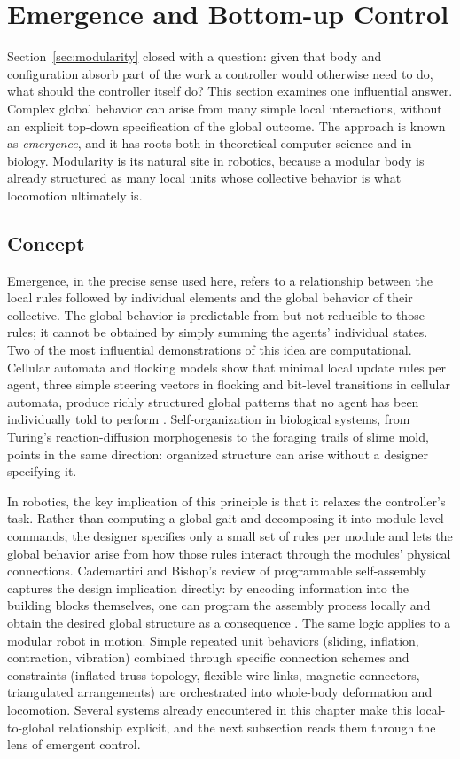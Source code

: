 \section{Emergence and Bottom-up Control}
\label{sec:emergence}

Section~\ref{sec:modularity} closed with a question: given that body and configuration absorb part of the work a controller would otherwise need to do, what should the controller itself do? This section examines one influential answer. Complex global behavior can arise from many simple local interactions, without an explicit top-down specification of the global outcome. The approach is known as \textit{emergence}, and it has roots both in theoretical computer science and in biology. Modularity is its natural site in robotics, because a modular body is already structured as many local units whose collective behavior is what locomotion ultimately is.

\subsection{Concept}
\label{subsec:mrr-Concept}
 
Emergence, in the precise sense used here, refers to a relationship between the local rules followed by individual elements and the global behavior of their collective. The global behavior is predictable from but not reducible to those rules; it cannot be obtained by simply summing the agents' individual states. Two of the most influential demonstrations of this idea are computational. Cellular automata and flocking models show that minimal local update rules per agent, three simple steering vectors in flocking and bit-level transitions in cellular automata, produce richly structured global patterns that no agent has been individually told to perform \cite{StephenWolframNew}. Self-organization in biological systems, from Turing's reaction-diffusion morphogenesis to the foraging trails of slime mold, points in the same direction: organized structure can arise without a designer specifying it.

In robotics, the key implication of this principle is that it relaxes the controller's task. Rather than computing a global gait and decomposing it into module-level commands, the designer specifies only a small set of rules per module and lets the global behavior arise from how those rules interact through the modules' physical connections. Cademartiri and Bishop's review of programmable self-assembly captures the design implication directly: by encoding information into the building blocks themselves, one can program the assembly process locally and obtain the desired global structure as a consequence \cite{cademartiriProgrammableSelfassembly2015}. The same logic applies to a modular robot in motion. Simple repeated unit behaviors (sliding, inflation, contraction, vibration) combined through specific connection schemes and constraints (inflated-truss topology, flexible wire links, magnetic connectors, triangulated arrangements) are orchestrated into whole-body deformation and locomotion. Several systems already encountered in this chapter make this local-to-global relationship explicit, and the next subsection reads them through the lens of emergent control.

